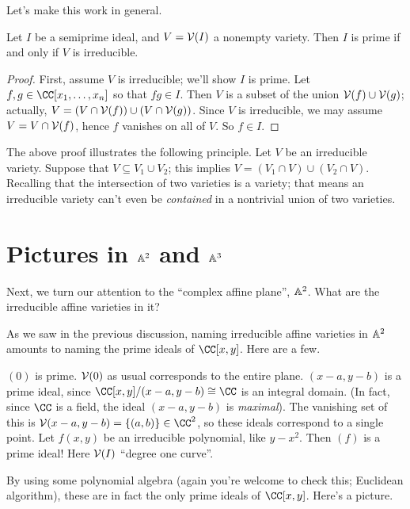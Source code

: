 Let's make this work in general.
\begin{theorem}
	Let $I$ be a semiprime ideal, and $V = \mathcal V(I)$ a nonempty variety.
	Then $I$ is prime if and only if $V$ is irreducible.
\end{theorem}
\begin{proof}
	First, assume $V$ is irreducible; we'll show $I$ is prime.
	Let $f,g \in \CC[x_1, \dots, x_n]$ so that $fg \in I$.
	Then $V$ is a subset of the union $\mathcal V(f) \cup \mathcal V(g)$;
	actually, $V = \left( V \cap \mathcal V(f) \right) \cup \left( V \cap \mathcal V(g) \right)$.
	Since $V$ is irreducible, we may assume $V = V \cap \mathcal V(f)$,
	hence $f$ vanishes on all of $V$. So $f \in I$.
\end{proof}

\begin{remark}
	The above proof illustrates the following principle.
	Let $V$ be an irreducible variety.
	Suppose that $V \subseteq V_1 \cup V_2$;
	this implies $V = (V_1 \cap V) \cup (V_2 \cap V)$.
	Recalling that the intersection of two varieties is a variety;
	that means an irreducible variety can't even be \emph{contained}
	in a nontrivial union of two varieties.
\end{remark}

\section{Pictures in $\mathbb A^2$ and $\mathbb A^3$}
Next, we turn our attention to the ``complex affine plane'', $\mathbb A^2$.
What are the irreducible affine varieties in it?

As we saw in the previous discussion, naming irreducible affine varieties in $\mathbb A^2$
amounts to naming the prime ideals of $\CC[x,y]$.
Here are a few.
\begin{enumerate}[(i)]
	\ii $(0)$ is prime. $\mathcal V(0)$ as usual corresponds to the entire plane.
	\ii $(x-a, y-b)$ is a prime ideal, since $\CC[x,y] / (x-a, y-b) \cong \CC$ is an integral domain.
	(In fact, since $\CC$ is a field, the ideal $(x-a,y-b)$ is \emph{maximal}).
	The vanishing set of this is $\VV(x-a, y-b) = \{ (a,b) \} \in \CC^2$,
	so these ideals correspond to a single point.
	\ii Let $f(x,y)$ be an irreducible polynomial, like $y-x^2$.
	Then $(f)$ is a prime ideal! Here $\mathcal V(I)$ ``degree one curve''.
\end{enumerate}

By using some polynomial algebra (again you're welcome to check this; Euclidean algorithm),
these are in fact the only prime ideals of $\CC[x,y]$.
Here's a picture.

